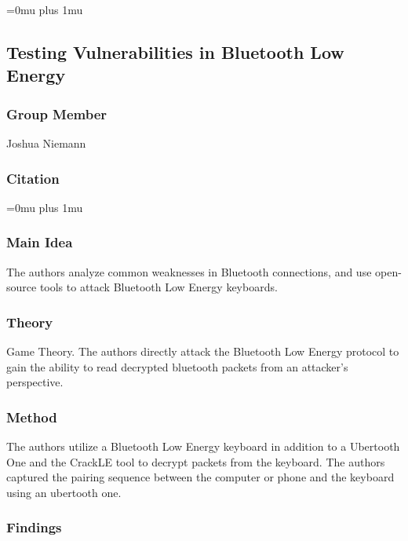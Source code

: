 \Urlmuskip=0mu plus 1mu\relax


\noindent
\subsection{Testing Vulnerabilities in Bluetooth Low Energy}

\subsubsection{Group Member}

\noindent
Joshua Niemann
\noindent
\subsubsection{Citation}

\Urlmuskip=0mu plus 1mu\relax

\subsubsection{Main Idea}

\noindent
The authors analyze common weaknesses in Bluetooth connections, and use open-source tools to attack Bluetooth Low Energy keyboards.

\subsubsection{Theory}

\noindent
Game Theory.  The authors directly attack the Bluetooth Low Energy protocol to gain the ability to read decrypted bluetooth packets from an attacker's perspective.

\subsubsection{Method}

\noindent
The authors utilize a Bluetooth Low Energy keyboard in addition to a Ubertooth One and the CrackLE tool to decrypt packets from the keyboard.  The authors captured the pairing sequence between the computer or phone and the keyboard using an ubertooth one.

\subsubsection{Findings}

